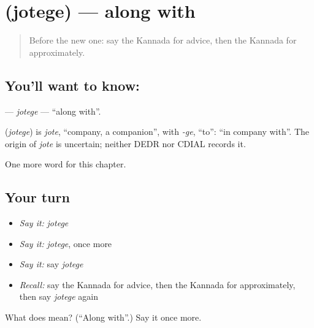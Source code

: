 \section[\texorpdfstring{\kn{ಜೊತೆಗೆ} (jotege)}{ಜೊತೆಗೆ (jotege)}]{ (jotege) — along with}

\label{lesson:KA-C252-jotege}



\begin{quote}
Before the new one: say the Kannada for advice, then the Kannada for approximately.
\end{quote}

\subsection*{You'll want to know: }
\textbf{} — \emph{jotege} — \textquotedblleft{}along with\textquotedblright{}.

\begin{cousinweb}
\textbf{} (\emph{jotege}) is \emph{jote}, \textquotedblleft{}company, a companion\textquotedblright{}, with \emph{-ge}, \textquotedblleft{}to\textquotedblright{}: \textquotedblleft{}in company with\textquotedblright{}. The origin of \emph{jote} is uncertain; neither DEDR nor CDIAL records it.
\end{cousinweb}

\begin{grammarlens}[title={What you've built}]
One more word for this chapter.
\end{grammarlens}

\subsection*{Your turn}
\begin{itemize}
\raggedright
  \item \emph{Say it:} \emph{jotege}
  \item \emph{Say it:} \emph{jotege}, once more
  \item \emph{Say it:} say \emph{jotege}
  \item \emph{Recall:} say the Kannada for advice, then the Kannada for approximately, then say \emph{jotege} again
\end{itemize}

\begin{tcolorbox}[breakable,colback=teal!4,colframe=teal!35!black,title={Before you move on}]
What does  mean? (\textquotedblleft{}Along with\textquotedblright{}.) Say it once more.
\end{tcolorbox}
